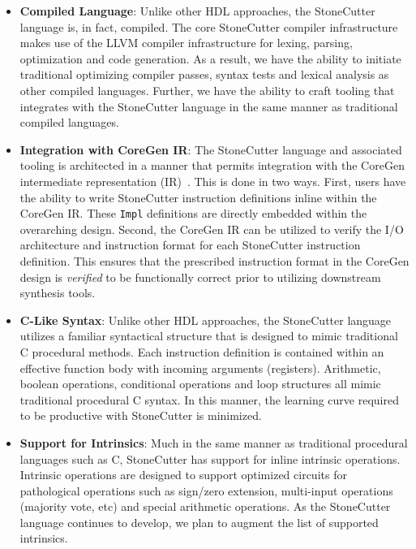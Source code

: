 \documentclass{article}
\begin{document}
\begin{itemize}
\item \textbf{Compiled Language}: Unlike other HDL approaches, the StoneCutter language 
is, in fact, compiled.  The core StoneCutter compiler infrastructure makes use of the LLVM 
compiler infrastructure for lexing, parsing, optimization and code generation.  As a result, we have 
the ability to initiate traditional optimizing compiler passes, syntax tests and lexical analysis as 
other compiled languages.  Further, we have the ability to craft tooling that integrates with the StoneCutter 
language in the same manner as traditional compiled languages.  

\item \textbf{Integration with CoreGen IR}: The StoneCutter language and associated tooling is architected 
in a manner that permits integration with the CoreGen intermediate representation (IR)~\cite{IRSpec}.  This 
is done in two ways.  First, users have the ability to write StoneCutter instruction definitions inline within the 
CoreGen IR.  These \texttt{Impl} definitions are directly embedded within the overarching design.  Second, 
the CoreGen IR can be utilized to verify the I/O architecture and instruction format for each StoneCutter 
instruction definition.  This ensures that the prescribed instruction format in the CoreGen design is \textit{verified} 
to be functionally correct prior to utilizing downstream synthesis tools.      

\item \textbf{C-Like Syntax}: Unlike other HDL approaches, the StoneCutter language utilizes a familiar 
syntactical structure that is designed to mimic traditional C procedural methods.  Each instruction definition 
is contained within an effective function body with incoming arguments (registers).  Arithmetic, boolean operations, 
conditional operations and loop structures all mimic traditional procedural C syntax.  In this manner, the learning 
curve required to be productive with StoneCutter is minimized.  

\item \textbf{Support for Intrinsics}: Much in the same manner as traditional procedural languages such as C, 
StoneCutter has support for inline intrinsic operations.  Intrinsic operations are designed to support optimized 
circuits for pathological operations such as sign/zero extension, multi-input operations (majority vote, etc) and 
special arithmetic operations.  As the StoneCutter language continues to develop, we plan to augment the list 
of supported intrinsics.  

\end{itemize}
\end{document}
